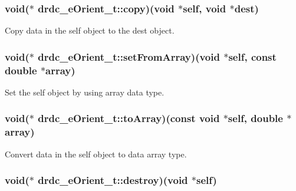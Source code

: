 \hypertarget{structdrdc__eOrient__t_1cf0f5c59d1a97bfa330155dccaa7470}{
\subsubsection[copy]{\setlength{\rightskip}{0pt plus 5cm}void($\ast$ {\bf drdc\_\-eOrient\_\-t::copy})(void $\ast$self, void $\ast$dest)}}
\label{structdrdc__eOrient__t_1cf0f5c59d1a97bfa330155dccaa7470}


Copy data in the self object to the dest object. 

\hypertarget{structdrdc__eOrient__t_4b1ac90f5adeaf67720d8d8c6525cdaa}{
\subsubsection[setFromArray]{\setlength{\rightskip}{0pt plus 5cm}void($\ast$ {\bf drdc\_\-eOrient\_\-t::setFromArray})(void $\ast$self, const double $\ast$array)}}
\label{structdrdc__eOrient__t_4b1ac90f5adeaf67720d8d8c6525cdaa}


Set the self object by using array data type. 

\hypertarget{structdrdc__eOrient__t_b91df71ef68638f3fcc2c0aff58f397c}{
\subsubsection[toArray]{\setlength{\rightskip}{0pt plus 5cm}void($\ast$ {\bf drdc\_\-eOrient\_\-t::toArray})(const void $\ast$self, double $\ast$array)}}
\label{structdrdc__eOrient__t_b91df71ef68638f3fcc2c0aff58f397c}


Convert data in the self object to data array type. 

\hypertarget{structdrdc__eOrient__t_cd7aeae5fcf08152b030a071523c1057}{
\subsubsection[destroy]{\setlength{\rightskip}{0pt plus 5cm}void($\ast$ {\bf drdc\_\-eOrient\_\-t::destroy})(void $\ast$self)}}
\label{structdrdc__eOrient__t_cd7aeae5fcf08152b030a071523c1057}


